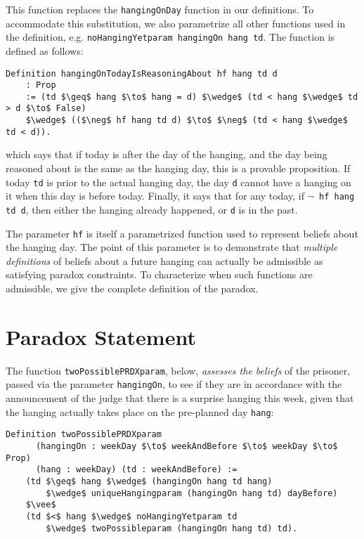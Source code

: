 \documentclass[runningheads]{llncs}
\begin{document}
This function replaces the
{\tt hangingOnDay} function in our definitions.
To accommodate this substitution, we also parametrize all
other functions used in the definition, e.g. {\tt noHangingYetparam hangingOn hang td}.
The function is defined as follows:

\begin{lstlisting}[mathescape=true]
  Definition hangingOnTodayIsReasoningAbout hf hang td d
    : Prop
    := (td $\geq$ hang $\to$ hang = d) $\wedge$ (td < hang $\wedge$ td > d $\to$ False)
    $\wedge$ (($\neg$ hf hang td d) $\to$ $\neg$ (td < hang $\wedge$ td < d)).
\end{lstlisting}

which says that if today is after the day of the hanging, and the
day being reasoned about is the same as the hanging day, this is a provable
proposition. If today {\tt td} is prior
to the actual hanging day, the day {\tt d}
cannot have a hanging on it when this day is before today. Finally,
it says that for any today, if {\tt $\neg$ hf hang td d}, then
either the hanging already happened, or {\tt d} is in the past.

The parameter {\tt hf} is itself a parametrized function used to represent beliefs
about the hanging day. The point of
this parameter is to demonstrate that \emph{multiple definitions} of beliefs about
a future hanging can actually be admissible as satisfying paradox constraints.
To characterize when such functions are admissible, we give the complete definition
of the paradox.

\section{Paradox Statement}
\label{sec:constraints}

The function {\tt twoPossiblePRDXparam}, below, \emph{assesses the beliefs}
of the prisoner, passed via the parameter {\tt hangingOn}, to see if they are in
accordance with the announcement of the
judge that there is a surprise hanging this week, given that the hanging actually
takes place on the pre-planned day {\tt hang}:

\begin{lstlisting}[mathescape=true]
  Definition twoPossiblePRDXparam
      (hangingOn : weekDay $\to$ weekAndBefore $\to$ weekDay $\to$ Prop)
      (hang : weekDay) (td : weekAndBefore) :=
    (td $\geq$ hang $\wedge$ (hangingOn hang td hang)
        $\wedge$ uniqueHangingparam (hangingOn hang td) dayBefore)
    $\vee$
    (td $<$ hang $\wedge$ noHangingYetparam td
        $\wedge$ twoPossibleparam (hangingOn hang td) td).
\end{lstlisting}
\end{document}
